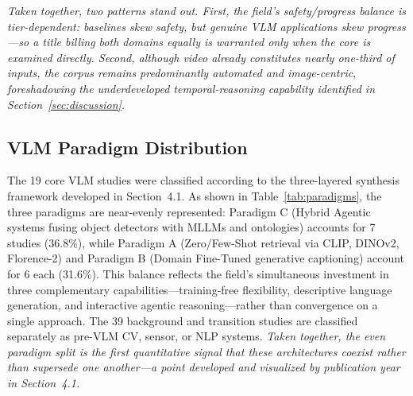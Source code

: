 \documentclass[10pt,letterpaper]{article}
\begin{document}
\textit{Taken together, two patterns stand out. First, the field's safety/progress balance is tier-dependent: baselines skew safety, but genuine VLM applications skew progress---so a title billing both domains equally is warranted only when the core is examined directly. Second, although video already constitutes nearly one-third of inputs, the corpus remains predominantly automated and image-centric, foreshadowing the underdeveloped temporal-reasoning capability identified in Section~\ref{sec:discussion}.}

\subsection{VLM Paradigm Distribution}

The 19 core VLM studies were classified according to the three-layered synthesis framework developed in Section~4.1. As shown in Table~\ref{tab:paradigms}, the three paradigms are near-evenly represented: Paradigm C (Hybrid Agentic systems fusing object detectors with MLLMs and ontologies) accounts for 7 studies (36.8\%), while Paradigm A (Zero/Few-Shot retrieval via CLIP, DINOv2, Florence-2) and Paradigm B (Domain Fine-Tuned generative captioning) account for 6 each (31.6\%). This balance reflects the field's simultaneous investment in three complementary capabilities---training-free flexibility, descriptive language generation, and interactive agentic reasoning---rather than convergence on a single approach. The 39 background and transition studies are classified separately as pre-VLM CV, sensor, or NLP systems. \textit{Taken together, the even paradigm split is the first quantitative signal that these architectures coexist rather than supersede one another---a point developed and visualized by publication year in Section~4.1.}
\end{document}
